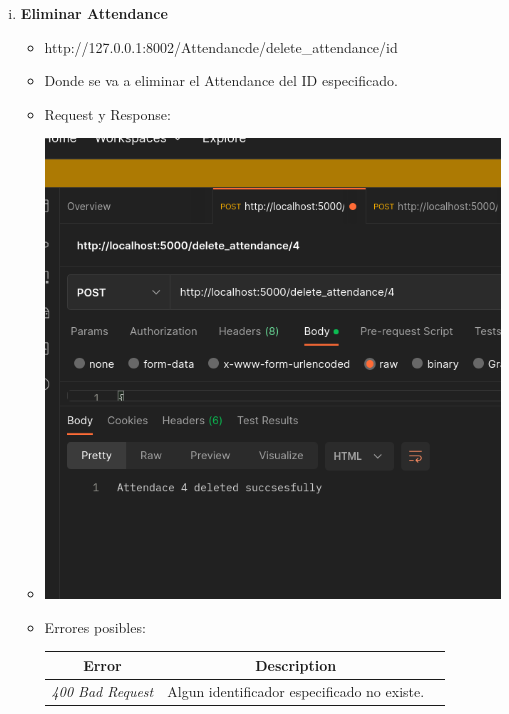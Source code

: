 \documentclass{article}
\begin{document}
\begin{enumerate}[i.]
\begin{itemize}
    \end{itemize}

    \item \textbf{Eliminar Attendance}
    \begin{itemize}
        \item http://127.0.0.1:8002/Attendancde/delete\_attendance/id
        \item Donde se va a eliminar el Attendance del ID especificado.
        \item Request y Response:
        \item \includegraphics[scale=.5]{assets/attendance/delete.png}
        \item Errores posibles:
        \begin{table}[H] \centering \begin{tabular}{|c|c|l|} \hline \textbf{Error}
        & \textbf{Description} \\ \hline \textit{400 Bad Request} & Algun
        identificador especificado no existe. \\ \hline \end{tabular}
        \end{table}
    \end{itemize}
\end{enumerate}

\end{document}
